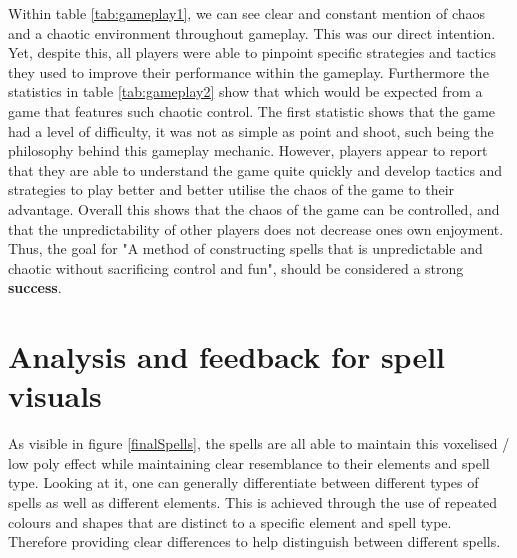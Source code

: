 \documentclass[12pt,a4paper]{report}
\begin{document}
Within table \ref{tab:gameplay1}, we can see clear and constant mention of chaos and a chaotic environment throughout gameplay. This was our direct intention. Yet, despite this, all players were able to pinpoint specific strategies and tactics they used to improve their performance within the gameplay. Furthermore the statistics in table \ref{tab:gameplay2} show that which would be expected from a game that features such chaotic control. The first statistic shows that the game had a level of difficulty, it was not as simple as point and shoot, such being the philosophy behind this gameplay mechanic. However, players appear to report that they are able to understand the game quite quickly and develop tactics and strategies to play better and better utilise the chaos of the game to their advantage. Overall this shows that the chaos of the game can be controlled, and that the unpredictability of other players does not decrease ones own enjoyment. Thus, the goal for "A method of constructing spells that is unpredictable and chaotic without sacrificing control and fun", should be considered a strong \textbf{success}.

\section{Analysis and feedback for spell visuals}

As visible in figure \ref{finalSpells}, the spells are all able to maintain this voxelised / low poly effect while maintaining clear resemblance to their elements and spell type. Looking at it, one can generally differentiate between different types of spells as well as different elements. This is achieved through the use of repeated colours and shapes that are distinct to a specific element and spell type. Therefore providing clear differences to help distinguish between different spells.
\end{document}
